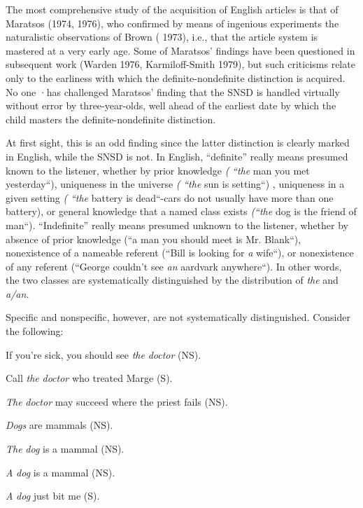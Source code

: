 The most comprehensive study of the acquisition of English articles is that of Maratsos (1974, 1976), who confirmed by means of ingenious experiments the naturalistic observations of Brown ( 1973), i.e., that the article system is mastered at a very early age. Some of Maratsos' findings have been questioned in subsequent work (Warden 1976, Karmiloff-Smith 1979), but such criticisms relate only to the earliness with which the definite-nondefinite distinction is acquired. No one ·has challenged Maratsos' finding that the SNSD is handled virtually without error by three-year-olds, well ahead of the earliest date by which the child masters the definite-nondefinite distinction.

At first sight, this is an odd finding since the latter distinction is clearly marked in English, while the SNSD is not. In English, ``definite'' really means presumed known to the listener, whether by prior knowledge \textit{(} \textit{``the} man you met yesterday``), uniqueness in the universe \textit{(} \textit{``the} sun is setting``) , uniqueness in a given setting \textit{(} \textit{``the} battery is dead``-cars do not usually have more than one battery), or general knowledge that a named class exists \textit{(``the} dog is the friend of man``). ``Indefinite'' really means presumed unknown to the listener, whether by absence of prior knowledge (``a man you should meet is Mr. Blank``), nonexistence of a nameable referent (``Bill is looking for \textit{a} wife``), or nonexistence of any referent (``George couldn't see \textit{an} aardvark anywhere``). In other words, the two classes are systematically distinguished by the distribution of \textit{the} and \textit{a/an.}

Specific and nonspecific, however, are not systematically dis\-tinguished. Consider the following:

\ea\label{ex:1}
 If you're sick, you should see \textit{the} \textit{doctor} (NS).
\z

\ea\label{ex:2}
 Call \textit{the} \textit{doctor} who treated Marge (S).
\z

\ea\label{ex:3}
 \textit{The} \textit{doctor} may succeed where the priest fails (NS).
\z

\ea\label{ex:4}
 \textit{Dogs} are mammals (NS).
\z

\ea\label{ex:5}
 \textit{The} \textit{dog} is a mammal (NS).
\z

\ea\label{ex:6}
 \textit{A} \textit{dog} is a mammal (NS).
\z

\ea\label{ex:7}
\textit{A} \textit{dog} just bit me (S).
\z

